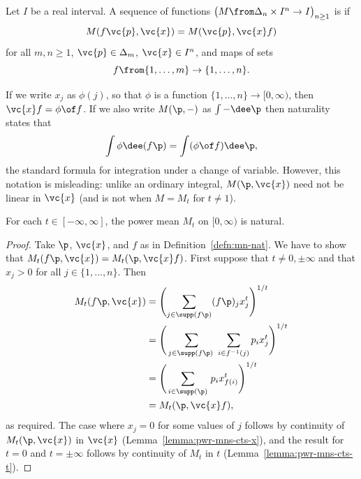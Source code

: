 \begin{defn}
Let $I$ be a real interval.  A sequence of functions $\bigl( M \from
\Delta_n \times I^n \to I \bigr)_{n \geq 1}$ is
%
%
% 
if  
\[
M(f\vc{p}, \vc{x}) = M(\vc{p}, \vc{x}f)
\]
for all $m, n \geq 1$, $\vc{p} \in \Delta_m$, $\vc{x} \in I^n$, and maps of
sets 
\[
f \from \{1, \ldots, m\} \to \{1, \ldots, n\}.
\]
\end{defn}

\begin{remark}
If we write $x_j$ as $\phi(j)$, so that $\phi$ is a function $\{1, \ldots,
n\} \to [0, \infty)$, then $\vc{x}f = \phi \of f$.  If we also write
$M(\p, -)$ as $\int - \dee\p$ then naturality states that
\[
\int \phi \dee(f \p) = \int (\phi \of f) \dee\p,
\]
the standard formula for integration under a change%
% 
% 
of variable.  However, this notation is misleading: unlike an ordinary
integral, $M(\p, \vc{x})$ need not be linear in $\vc{x}$ (and is not when
$M = M_t$ for $t \neq 1$).
\end{remark}

\begin{lemma}[Naturality]
% 
For each $t \in [-\infty, \infty]$, the power mean $M_t$ on $[0, \infty)$
  is natural.
\end{lemma}

\begin{proof}
Take $\p$, $\vc{x}$, and $f$ as in Definition~\ref{defn:mn-nat}.  We have to
show that $M_t(f\p, \vc{x}) = M_t(\p, \vc{x}f)$.  First suppose that $t
\neq 0, \pm\infty$ and that $x_j > 0$ for all $j \in \{1, \ldots, n\}$.
Then
% 
\begin{align*}
M_t(f\p, \vc{x})     &
=
\Biggl( \sum_{j \in \supp(f\p)} (f \p)_j x_j^t \Biggr)^{1/t}    \\
&
=
\Biggl( 
\sum_{\,j \in \supp(f\p)\ } \sum_{i \in f^{-1}(j)} p_i x_j^t 
\Biggr)^{1/t}   \\
&
=
\Biggl( \sum_{\,i \in \supp(\p)\,} p_i x_{f(i)}^t \Biggr)^{1/t}     \\
&
=
M_t(\p, \vc{x}f),
\end{align*}
% 
as required.  The case where $x_j = 0$ for some values of $j$ follows by
continuity of $M_t(\p, \vc{x})$ in $\vc{x}$
(Lemma~\ref{lemma:pwr-mns-cts-x}), and the result for $t = 0$ and $t =
\pm\infty$ follows by continuity of $M_t$ in $t$
(Lemma~\ref{lemma:pwr-mns-cts-t}).  
\end{proof}

